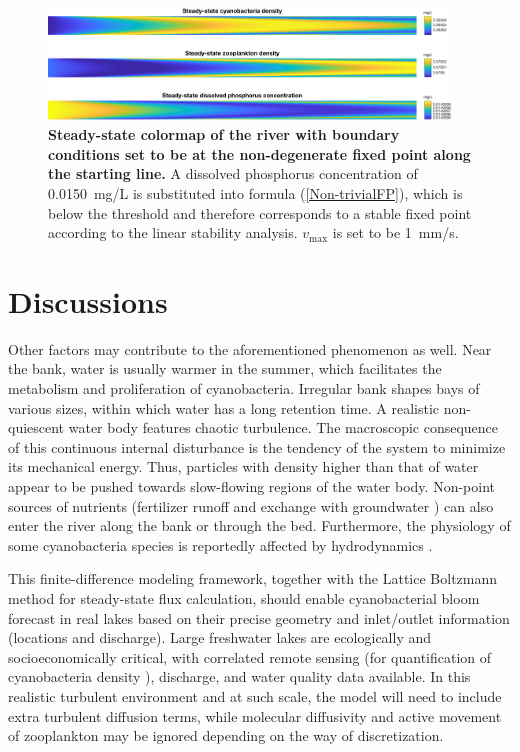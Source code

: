 \documentclass{article}
\begin{document}
\begin{figure}[H]
    \centering
    \includegraphics[width=0.95\textwidth]{Point0150Oscillate.pdf}
    \caption{\textbf{Steady-state colormap of the river with boundary conditions set to be at the non-degenerate fixed point along the starting line.} A dissolved phosphorus concentration of \SI{0.0150}{mg/L} is substituted into formula (\ref{Non-trivialFP}), which is below the threshold and therefore corresponds to a stable fixed point according to the linear stability analysis. $v_{\max}$ is set to be \SI{1}{mm/s}.}
    \label{PhaseOscillationBlurredByDiffusion}
\end{figure}

\section*{Discussions}
Other factors may contribute to the aforementioned phenomenon as well.
Near the bank, water is usually warmer in the summer, which facilitates the metabolism and proliferation of cyanobacteria. Irregular bank shapes bays of various sizes, within which water has a long retention time. A realistic non-quiescent water body features chaotic turbulence. The macroscopic consequence of this continuous internal disturbance is the tendency of the system to minimize its mechanical energy. Thus, particles with density higher than that of water appear to be pushed towards slow-flowing regions of the water body. Non-point sources of nutrients (fertilizer runoff and exchange with groundwater \cite{SubsurfaceP}) can also enter the river along the bank or through the bed. Furthermore, the physiology of some cyanobacteria species is reportedly affected by hydrodynamics \cite{HydrodynamicsInfluence}.

This finite-difference modeling framework, together with the Lattice Boltzmann method \cite{BGK} for steady-state flux calculation, should enable cyanobacterial bloom forecast in real lakes based on their precise geometry and inlet/outlet information (locations and discharge). Large freshwater lakes are ecologically and socioeconomically critical, with correlated remote sensing (for quantification of cyanobacteria density \cite{MuPI}), discharge, and water quality data available. In this realistic turbulent environment and at such scale, the model will need to include extra turbulent diffusion terms, while molecular diffusivity and active movement of zooplankton may be ignored depending on the way of discretization.
\end{document}
